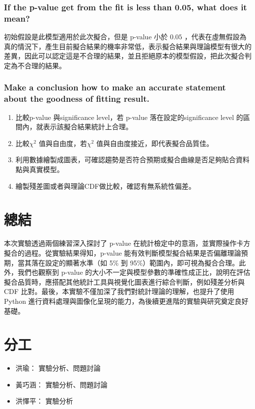 \documentclass[12pt,a4paper]{article}
\begin{document}
\begin{CJK}{UTF8}{bkai}
\subsubsection{If the \textbf{p-value} get from the fit is less than 0.05, what does it mean?}
\hfill

初始假設是此模型適用於此次擬合，但是 p-value 小於 $0.05$ ，代表在虛無假設為真的情況下，產生目前擬合結果的機率非常低，表示擬合結果與理論模型有很大的差異，因此可以認定這是不合理的結果，並且拒絕原本的模型假設，把此次擬合判定為不合理的結果。

\subsubsection{Make a conclusion how to make an accurate statement about the goodness of fitting result.}
\hfill

\begin{enumerate}
    \item 比較p-value 與significance level，若 p-value 落在設定的significance level 的區間內，就表示該擬合結果統計上合理。
    \item 比較$\chi^2$ 值與自由度，若$\chi^2$ 值與自由度接近，即代表擬合品質佳。
    \item 利用數據繪製成圖表，可確認趨勢是否符合預期或擬合曲線是否足夠貼合資料點與真實模型。
    \item 繪製殘差圖或者與理論CDF做比較，確認有無系統性偏差。
\end{enumerate}


\section{總結}
\hfill

本次實驗透過兩個練習深入探討了 p-value 在統計檢定中的意涵，並實際操作卡方擬合的過程。從實驗結果得知，p-value 能有效判斷模型擬合結果是否偏離理論預期，當其落在設定的顯著水準（如 5\% 到 95\%）範圍內，即可視為擬合合理。此外，我們也觀察到 p-value 的大小不一定與模型參數的準確性成正比，說明在評估擬合品質時，應搭配其他統計工具與視覺化圖表進行綜合判斷，例如殘差分析與 CDF 比對。最後，本實驗不僅加深了我們對統計理論的理解，也提升了使用 Python 進行資料處理與圖像化呈現的能力，為後續更進階的實驗與研究奠定良好基礎。


\section{分工}
\begin{itemize}
    \item 洪瑜： 實驗分析、問題討論
    \item 黃巧涵： 實驗分析、問題討論
    \item 洪懌平： 實驗分析
\end{itemize}



\end{CJK}
\end{document}
